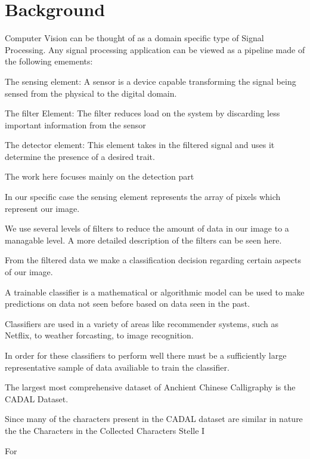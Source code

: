 \chapter{Background}

Computer Vision can be thought of as a domain specific type of Signal Processing.  Any signal processing application can be viewed as a pipeline made of the following emements:

The sensing element:  A sensor is a device capable transforming the signal being sensed from the physical to the digital domain.

The filter Element:  The filter reduces load on the system by discarding less important information from the sensor

The detector element:  This element takes in the filtered signal and uses it determine the presence of a desired trait.

The work here focuses mainly on the detection part 


In our specific case the sensing element represents the array of pixels which represent our image.

We use several levels of filters to reduce the amount of data in our image to a managable level.  A more detailed description of the filters can be seen here.

From the filtered data we make a classification decision regarding certain aspects of our image.

A trainable classifier is a mathematical or algorithmic model can be used to make predictions on data not seen before based on data seen in the past.

Classifiers are used in a variety of areas like recommender systems, such as Netflix, to weather forcasting, to image recognition.

In order for these classifiers to perform well there must be a sufficiently large representative sample of data availiable to train the classifier.


The largest most comprehensive dataset of Anchient Chinese Calligraphy is the CADAL Dataset.

Since many of the characters present in the CADAL dataset are similar in nature the the Characters in the Collected Characters Stelle I 

For 

